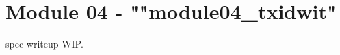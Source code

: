 \newpage
\section{Module 04 - {\ttfamily ""module04\_txidwit"}}
\label{sec:module04_predicate}

spec writeup WIP.

